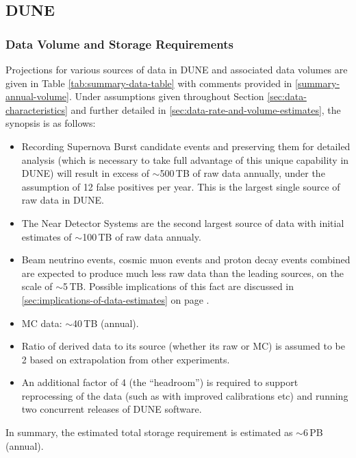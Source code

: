 \subsection{DUNE}
\subsubsection{Data Volume and Storage Requirements}
Projections for various sources of data in DUNE and associated data volumes are given in
Table \ref{tab:summary-data-table} with comments provided in \ref{summary-annual-volume}.
Under assumptions given throughout Section \ref{sec:data-characteristics} and further detailed
in \ref{sec:data-rate-and-volume-estimates}, the synopsis is as follows:
\begin{itemize}

\item Recording Supernova Burst candidate events and preserving them for detailed analysis (which is necessary to take
full advantage of this unique capability in DUNE) will result in excess of $\sim$500\,TB of raw data annually, under the assumption
of 12 false positives per year. This is the largest single source of raw data in DUNE.

\item The Near Detector Systems are the second largest source of data with initial estimates of $\sim$100\,TB of raw data annualy.

\item Beam neutrino events, cosmic muon events and proton decay events combined are expected to produce
much less raw data than the leading sources, on the scale of  $\sim$5\,TB. Possible implications of this fact
are discussed in \ref{sec:implications-of-data-estimates} on page \pageref{sec:implications-of-data-estimates}.

\item MC data: $\sim$40\,TB (annual).

\item Ratio of derived data to its source (whether its raw or MC) is assumed to be 2 based on extrapolation from other experiments.

\item An additional factor of 4 (the ``headroom'') is required to support reprocessing of the data (such as with improved calibrations etc)
and running two concurrent releases of DUNE software.

\end{itemize}

In summary, the estimated total storage requirement is estimated as $\sim$6\,PB (annual).

